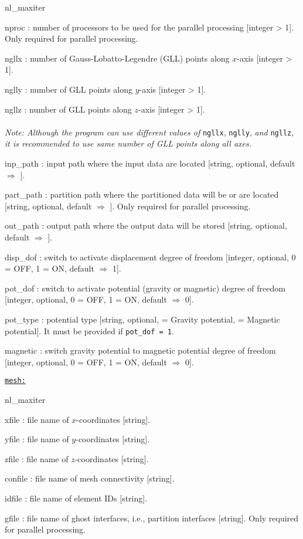 \begin{adescription}{nl\_maxiter}
  \item[nproc] : number of processors to be used for the parallel processing [integer > 1]. Only required for parallel processing.
  \item[ngllx] : number of Gauss-Lobatto-Legendre (GLL) points along $x$-axis [integer > 1].
  \item[nglly] : number of GLL points along $y$-axis [integer > 1].
  \item[ngllz] : number of GLL points along $z$-axis [integer > 1]. \\\\
  {\emph{Note: Although the program can use different values of}} \texttt{ngllx}, \texttt{nglly}, {\emph{and}} \texttt{ngllz}, {\emph{it is recommended to use same number of GLL points along all axes.}}
  \item[inp\_path]  : input path where the input data are located [string, optional, default $\Rightarrow$ \texttt{}].
  \item[part\_path] : partition path where the partitioned data will be or are located [string, optional, default $\Rightarrow$ \texttt{}]. Only required for parallel processing.
  \item[out\_path]  : output path where the output data will be stored [string, optional, default $\Rightarrow$ \texttt{}].
  \item[disp\_dof]  : switch to activate displacement degree of freedom [integer, optional, 0 = OFF, 1 = ON, default $\Rightarrow$ 1].
  \item[pot\_dof]  : switch to activate potential (gravity or magnetic) degree of freedom [integer, optional, 0 = OFF, 1 = ON, default $\Rightarrow$ 0].
  \item[pot\_type] : potential type [string, optional,\texttt{} = Gravity potential, \texttt{} = Magnetic potential]. It must be provided if \texttt{pot\_dof = 1}.
  \item[magnetic]  : switch gravity potential to magnetic potential degree of freedom [integer, optional, 0 = OFF, 1 = ON, default $\Rightarrow$ 0].
  \\
\end{adescription}


\texttt{\underline{mesh:}}
\begin{adescription}{nl\_maxiter}
  \item[xfile] : file name of $x$-coordinates [string].
  \item[yfile] : file name of $y$-coordinates [string].
  \item[zfile] : file name of $z$-coordinates [string].
  \item[confile]: file name of mesh connectivity [string].
  \item[idfile]: file name of element IDs [string].
  \item[gfile]: file name of ghost interfaces, i.e., partition interfaces [string]. Only required for parallel processing.  \\
\end{adescription}


